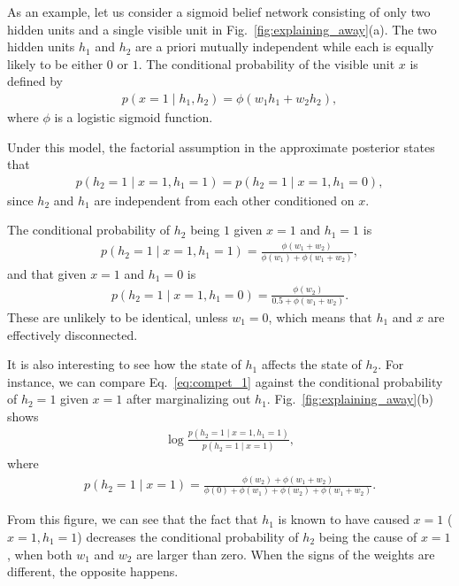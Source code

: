 \documentclass{now}
\begin{document}
As an example, let us consider a sigmoid belief network consisting of only two
hidden units and a single visible unit in Fig.~\ref{fig:explaining_away}(a). The
two hidden units $h_1$ and $h_2$ are a priori mutually independent while each is
equally likely to be either $0$ or $1$. The conditional probability of the
visible unit $x$ is defined by 
\begin{align*}
    p(x = 1 \mid h_1, h_2) = \phi(w_1 h_1 + w_2 h_2),
\end{align*}
where $\phi$ is a logistic sigmoid function.

Under this model, the factorial assumption in the approximate posterior states
that 
\begin{align}
    \label{eq:cond_ind}
    p(h_2 = 1 \mid x = 1, h_1 = 1) = p(h_2 = 1 \mid x = 1,
    h_1 = 0),
\end{align}
since $h_2$ and $h_1$ are independent from each other conditioned on $x$. 

The conditional probability of $h_2$ being $1$ given $x=1$ and $h_1=1$ is 
\begin{align}
    \label{eq:compet_1}
    p(h_2 = 1 \mid x=1, h_1=1) = \frac{\phi(w_1 +
    w_2)}{\phi(w_1) + \phi(w_1 + w_2)},
\end{align}
and that given $x=1$ and $h_1=0$ is
\begin{align}
    \label{eq:compet_2}
    p(h_2 = 1 \mid x = 1, h_1 =0) = \frac{\phi(w_2)}{0.5 +
    \phi(w_1 + w_2)}.
\end{align}
These are unlikely to be identical, unless $w_1=0$, which means that $h_1$ and
$x$ are effectively disconnected. 

It is also interesting to see how the state of $h_1$ affects the state of $h_2$.
For instance, we can compare Eq.~\eqref{eq:compet_1} against the conditional
probability of $h_2=1$ given $x=1$ after marginalizing out $h_1$.
Fig.~\ref{fig:explaining_away}(b) shows 
\begin{align*}
    \log\frac{p(h_2 = 1 \mid x=1, h_1 = 1)}{p(h_2=1 \mid
    x=1)},
\end{align*}
where
\begin{align*}
    p(h_2 = 1 \mid x = 1) = \frac{\phi(w_2) +
    \phi(w_1+w_2)}{\phi(0) + \phi(w_1) + \phi(w_2) +
    \phi(w_1+w_2)}.
\end{align*}

From this figure, we can see that the fact that $h_1$ is known to have caused
$x=1$ ($x=1,h_1=1$) decreases the conditional probability of $h_2$ being the
cause of $x=1$, when both $w_1$ and $w_2$ are larger than zero. When the signs
of the weights are different, the opposite happens.
\end{document}
